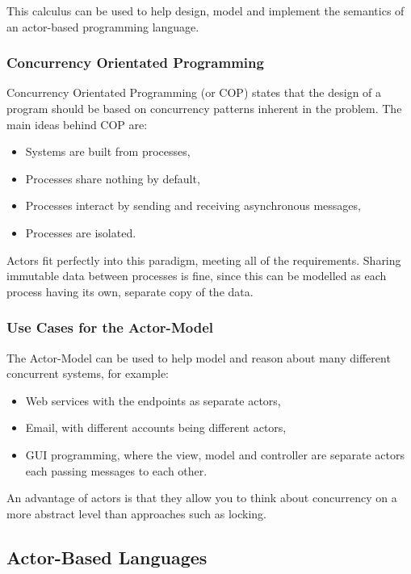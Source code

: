 \documentclass[pdftex,12pt,a4paper]{article}
\begin{document}
This calculus can be used to help design, model and implement the semantics of an actor-based programming language.

\subsubsection{Concurrency Orientated Programming}
Concurrency Orientated Programming\cite{armstrong2007} (or COP) states that the design of a program should be based on concurrency patterns inherent in the problem.
The main ideas behind COP are:
\begin{itemize}
\item Systems are built from processes,
\item Processes share nothing by default,
\item Processes interact by sending and receiving asynchronous messages,
\item Processes are isolated.
\end{itemize}

Actors fit perfectly into this paradigm, meeting all of the requirements.
Sharing immutable data between processes is fine, since this can be modelled as each process having its own, separate copy of the data.

\subsubsection{Use Cases for the Actor-Model}

The Actor-Model can be used to help model and reason about many different concurrent systems, for example:

\begin{itemize}[noitemsep]
\item Web services with the endpoints as separate actors,
\item Email, with different accounts being different actors,
\item GUI programming, where the view, model and controller are separate actors 	 each passing messages to each other.
\end{itemize}

An advantage of actors is that they allow you to think about concurrency on a more abstract level than approaches such as locking.

\newpage
\subsection{Actor-Based Languages}
\end{document}
